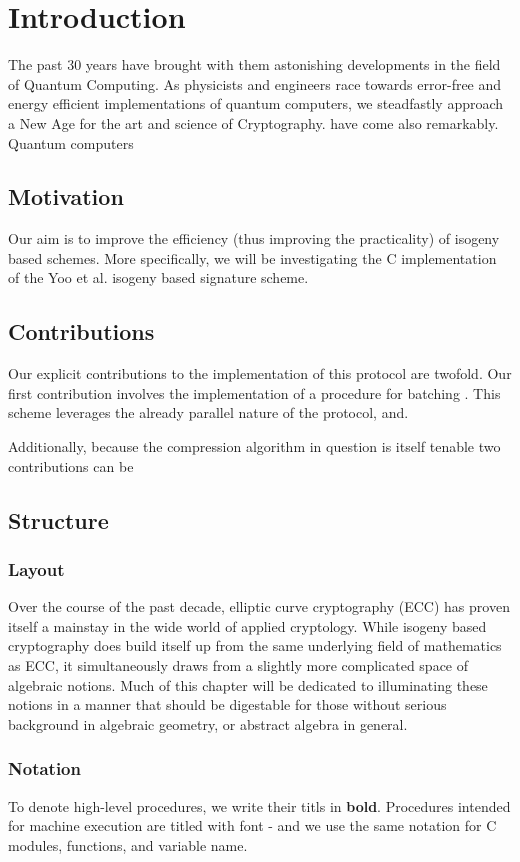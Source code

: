 \chapter{Introduction}

The past 30 years have brought with them astonishing developments in the field of Quantum Computing. As physicists and engineers race towards error-free and energy efficient implementations of quantum computers, we steadfastly approach a New Age for the art and science of Cryptography.  have come also remarkably. Quantum computers 

\section{Motivation}

Our aim is to improve the efficiency (thus improving the practicality) of isogeny based schemes. More specifically, we will be investigating the C implementation of the Yoo et al. isogeny based signature scheme. 


\section{Contributions}

Our explicit contributions to the implementation of this protocol are twofold. Our first contribution involves the implementation of a procedure for batching . This scheme leverages the already parallel nature of the protocol, and.

Additionally, because the compression algorithm in question is itself tenable two contributions can be 


\section{Structure}



\subsection{Layout}

Over the course of the past decade, elliptic curve cryptography (ECC) has proven itself a mainstay in the wide world of applied cryptology. While isogeny based cryptography does build itself up from the same underlying field of mathematics as ECC, it simultaneously draws from a slightly more complicated space of algebraic notions. Much of this chapter will be dedicated to illuminating these notions in a manner that should be digestable for those without serious background in algebraic geometry, or abstract algebra in general.

\subsection{Notation}

To denote high-level procedures, we write their titls in \textbf{bold}. Procedures intended for machine execution are titled with  font - and we use the same notation for C modules, functions, and variable name. 